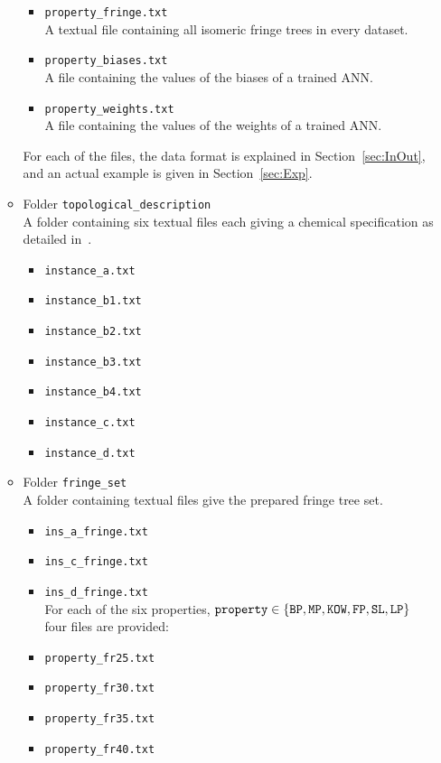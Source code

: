 \documentclass[11pt, titlepage, dvipdfmx, twoside]{article}
\begin{document}
\begin{itemize}
\begin{itemize}
\begin{itemize}
\item {\tt property\_fringe.txt}\\
A textual file containing all isomeric fringe trees in every dataset.

\item {\tt property\_biases.txt}\\
A file containing the values of the biases of a trained ANN.

\item {\tt property\_weights.txt}\\
A file containing the values of the weights of a trained ANN.
\end{itemize}
%
For each of the files, the data format is explained in Section~\ref{sec:InOut},
and an actual example is given in Section~\ref{sec:Exp}.

\item Folder {\tt topological\_description}\\
A folder containing six textual files each giving a chemical specification as detailed 
in~\cite{cyclic_BH_arxiv}.
%
\begin{itemize}
 \item {\tt instance\_a.txt} 
 \item {\tt instance\_b1.txt} 
 \item {\tt instance\_b2.txt} 
 \item {\tt instance\_b3.txt}
 \item {\tt instance\_b4.txt}  
 \item {\tt instance\_c.txt} 
 \item {\tt instance\_d.txt} 
\end{itemize}

\item Folder {\tt fringe\_set}\\
A folder containing textual files give the prepared fringe tree set.
%
\begin{itemize}
 \item {\tt ins\_a\_fringe.txt} 
 \item {\tt ins\_c\_fringe.txt}
 \item {\tt ins\_d\_fringe.txt}\\ 
 For each of the six properties, ${\tt property} \in \{{\tt BP, MP, KOW, FP, SL, LP}\}$ four files are provided:
 \item {\tt property\_fr25.txt} 
 \item {\tt property\_fr30.txt}
 \item {\tt property\_fr35.txt}
 \item {\tt property\_fr40.txt}\\
\end{itemize}


\end{itemize}
\end{itemize}
\end{document}
